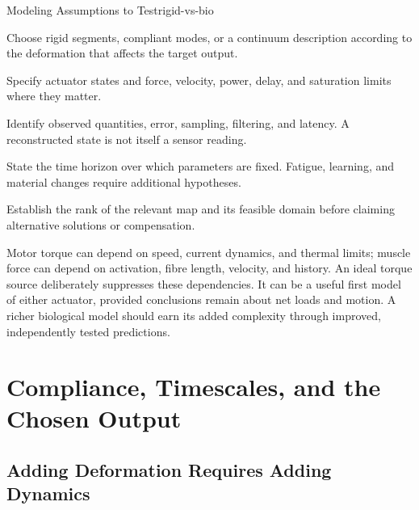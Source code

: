 \begin{comparison}{Modeling Assumptions to Test}{rigid-vs-bio}
\begin{description}[leftmargin=0.6em,style=nextline]
 \item[Structure] Choose rigid segments, compliant modes, or a continuum
 description according to the deformation that affects the target output.
 \item[Actuation] Specify actuator states and force, velocity, power, delay,
 and saturation limits where they matter.
 \item[Sensing] Identify observed quantities, error, sampling, filtering,
 and latency. A reconstructed state is not itself a sensor reading.
 \item[Adaptation] State the time horizon over which parameters are fixed.
 Fatigue, learning, and material changes require additional hypotheses.
 \item[Redundancy] Establish the rank of the relevant map and its feasible
 domain before claiming alternative solutions or compensation.
\end{description}
\end{comparison}

Motor torque can depend on speed, current dynamics, and thermal limits;
muscle force can depend on activation, fibre length, velocity, and history.
An ideal torque source deliberately suppresses these dependencies. It can
be a useful first model of either actuator, provided conclusions remain about
net loads and motion. A richer biological model should earn its added
complexity through improved, independently tested predictions.

\section{Compliance, Timescales, and the Chosen Output}
\subsection{Adding Deformation Requires Adding Dynamics}

